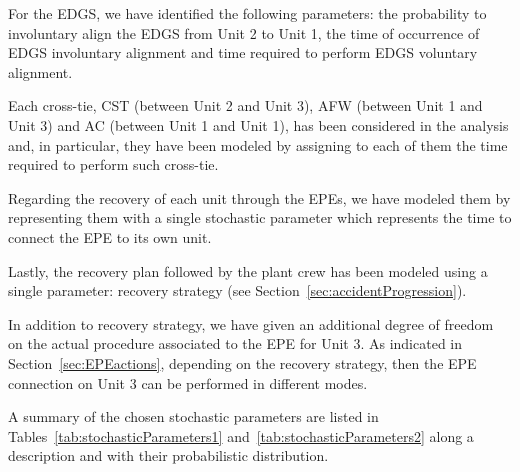 For the EDGS, we have identified the following parameters: the probability to 
involuntary align the EDGS from Unit 2 to Unit 1, the time of occurrence of EDGS
involuntary alignment and time required to perform EDGS voluntary alignment.  

Each cross-tie, CST (between Unit 2 and Unit 3), AFW (between Unit 1 and Unit 3) 
and AC (between Unit 1 and Unit 1), has been considered in the analysis and, in 
particular, they have been modeled by assigning to each of them the time required 
to perform such cross-tie.

Regarding the recovery of each unit through the EPEs, we have modeled them by 
representing them with a single stochastic parameter which represents the
time to connect the EPE to its own unit.

Lastly, the recovery plan followed by the plant crew has been modeled using a single
parameter: recovery strategy (see Section~\ref{sec:accidentProgression}).

In addition to recovery strategy, we have given an additional degree of freedom on 
the actual procedure associated to the EPE for Unit 3. 
As indicated in Section~\ref{sec:EPEactions}, depending on the  recovery strategy, 
then the EPE connection on Unit 3 can be performed in different modes. 

A summary of the chosen stochastic parameters are listed in Tables~\ref{tab:stochasticParameters1} 
and~\ref{tab:stochasticParameters2}
along a description and with their probabilistic distribution.

